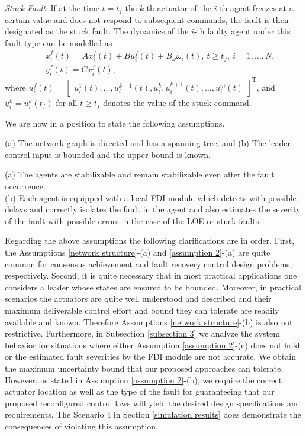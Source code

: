 \documentclass[12pt,draftcls,onecolumn]{IEEEtran}
\begin{document}
\noindent \underline{\emph{Stuck Fault}}: If at the time $t=t_f$ the $k$-th actuator of the $i$-th agent  freezes at a certain value and does not respond to subsequent commands, the fault is then designated as the stuck fault.  The dynamics of the $i$-th faulty agent under this  fault type can be modelled as
\begin{eqnarray}
&&\dot x_i^f(t)=A x_i^f(t)+B u_i^f (t)+B_\omega \omega_i(t),\ t\geq t_f,\ i=1,\dots,N, \label{LIP}\\
&&y_i^f(t)=Cx_i^f(t),\nonumber
\end{eqnarray} 
where $u_i^f(t)=\begin{bmatrix}u_i^1(t),\dots,u_i^{k-1}(t),\underline{u}_i^k,u_i^{k+1}(t),\dots,u_i^{m}(t)\end{bmatrix}^{\text{T}}$, and $\underline{u}_i^k=u_i^k(t_f)$ for all $t\geq t_f$ denotes the value of the stuck command. \par
We are now in a position to state the following assumptions. 
\begin{assumptions}\label{network structure}
(a) The network graph is directed and  has a spanning tree, and 
(b) The leader control input is bounded and the upper bound is known.
 \end{assumptions}
 \begin{assumptions}\label{assumption 2}
(a) The agents are stabilizable and remain stabilizable even after the fault occurrence.\\
(b) Each agent is equipped with a local FDI module which detects with possible delays and correctly isolates the fault in the agent and also estimates the severity of the fault with possible errors in the case of the LOE or stuck faults. 
\end{assumptions}
Regarding the above assumptions the following clarifications are in order. First, the Assumptions \ref{network structure}-(a) and  \ref{assumption 2}-(a)  are  quite common   for consensus achievement and fault recovery control design problems, respectively.   
Second, it is quite necessary that in most
practical applications one considers a leader whose states
are ensured to be bounded. Moreover, in practical scenarios
the actuators are quite well understood and described
and their maximum deliverable control effort and bound they can tolerate are readily available and known. Therefore Assumptions \ref{network structure}-(b) is also not  restrictive. Furthermore, in Subsection \ref{subsection 3} we analyze the system behavior for situations where either Assumption \ref{assumption 2}-(c) does not hold or 
  the estimated fault severities by the FDI module are not accurate. We obtain the maximum uncertainty bound that our proposed approaches can tolerate.  However, as stated in Assumption \ref{assumption 2}-(b),  we require the correct actuator location  as well as the type of the fault for guaranteeing that our proposed reconfigured control laws will yield the desired design specifications and requirements. The Scenario $4$ in Section \ref{simulation results} does demonstrate the consequences of violating this assumption.
 
\end{document}
